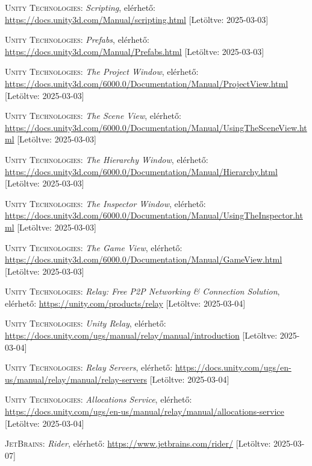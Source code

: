 \documentclass[]{thesis-ekf}
\theoremstyle{definition}
\theoremstyle{remark}
\begin{document}
\begin{thebibliography}{2}
	\textsc{Unity Technologies}: \emph{Scripting}, elérhető:
	\url{https://docs.unity3d.com/Manual/scripting.html} [Letöltve: 2025-03-03]
	
	\textsc{Unity Technologies}: \emph{Prefabs}, elérhető:
	\url{https://docs.unity3d.com/Manual/Prefabs.html} [Letöltve: 2025-03-03]
	
	\textsc{Unity Technologies}: \emph{The Project Window}, elérhető:
	\url{https://docs.unity3d.com/6000.0/Documentation/Manual/ProjectView.html} [Letöltve: 2025-03-03]
	
	\textsc{Unity Technologies}: \emph{The Scene View}, elérhető:
	\url{https://docs.unity3d.com/6000.0/Documentation/Manual/UsingTheSceneView.html} [Letöltve: 2025-03-03]
	
	\textsc{Unity Technologies}: \emph{The Hierarchy Window}, elérhető:
	\url{https://docs.unity3d.com/6000.0/Documentation/Manual/Hierarchy.html} [Letöltve: 2025-03-03]
	
	\textsc{Unity Technologies}: \emph{The Inspector Window}, elérhető:
	\url{https://docs.unity3d.com/6000.0/Documentation/Manual/UsingTheInspector.html} [Letöltve: 2025-03-03]
	
	\textsc{Unity Technologies}: \emph{The Game View}, elérhető:
	\url{https://docs.unity3d.com/6000.0/Documentation/Manual/GameView.html} [Letöltve: 2025-03-03]
	
	\textsc{Unity Technologies}: \emph{Relay: Free P2P Networking \& Connection Solution}, elérhető:
	\url{https://unity.com/products/relay} [Letöltve: 2025-03-04]
	
	\textsc{Unity Technologies}: \emph{Unity Relay}, elérhető:
	\url{https://docs.unity.com/ugs/manual/relay/manual/introduction} [Letöltve: 2025-03-04]
	
	\textsc{Unity Technologies}: \emph{Relay Servers}, elérhető:
	\url{https://docs.unity.com/ugs/en-us/manual/relay/manual/relay-servers} [Letöltve: 2025-03-04]
	
	\textsc{Unity Technologies}: \emph{Allocations Service}, elérhető:
	\url{https://docs.unity.com/ugs/en-us/manual/relay/manual/allocations-service} [Letöltve: 2025-03-04]
	
	\textsc{JetBrains}: \emph{Rider}, elérhető:
	\url{https://www.jetbrains.com/rider/} [Letöltve: 2025-03-07]
	

\end{thebibliography}
\end{document}
